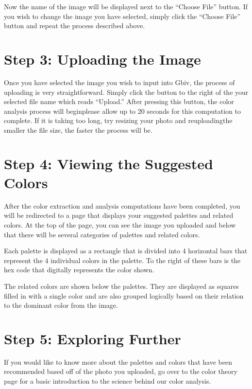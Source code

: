 \documentclass[letterpaper,10pt,english,openany,oneside]{sphinxmanual}
\begin{document}
\sphinxAtStartPar
Now the name of the image will be displayed next to the “Choose File” button. If you wish to change the image you have selected, simply click the “Choose File” button and repeat the process described above.


\section{Step 3: Uploading the Image}
\label{\detokenize{walkthrough:step-3-uploading-the-image}}
\sphinxAtStartPar
Once you have selected the image you wish to input into Gbiv, the process of uploading is very straightforward. Simply click the button to the right of the your selected file name which reads “Upload.” After pressing this button, the color analysis process will begin\textendash{}please allow up to 20 seconds for this computation to complete. If it is taking too long, try resizing your photo and re\sphinxhyphen{}uploading\textendash{}the smaller the file size, the faster the process will be.


\section{Step 4: Viewing the Suggested Colors}
\label{\detokenize{walkthrough:step-4-viewing-the-suggested-colors}}
\sphinxAtStartPar
After the color extraction and analysis computations have been completed, you will be re\sphinxhyphen{}directed to a page that displays your suggested palettes and related colors. At the top of the page, you can see the image you uploaded and below that there will be several categories of palettes and related colors.

\sphinxAtStartPar
Each palette is displayed as a rectangle that is divided into 4 horizontal bars that represent the 4 individual colors in the palette. To the right of these bars is the hex code that digitally represents the color shown.

\sphinxAtStartPar
The related colors are shown below the palettes. They are displayed as squares filled in with a single color and are also grouped logically based on their relation to the dominant color from the image.


\section{Step 5: Exploring Further}
\label{\detokenize{walkthrough:step-5-exploring-further}}
\sphinxAtStartPar
If you would like to know more about the palettes and colors that have been recommended based off of the photo you uploaded, go over to the color theory page for a basic introduction to the science behind our color analysis.
\end{document}
